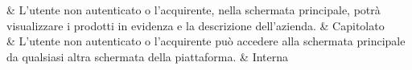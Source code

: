  & L'utente non autenticato o l'acquirente, nella schermata principale, potrà visualizzare i prodotti in evidenza e la descrizione dell'azienda. & Capitolato \\

 & L'utente non autenticato o l'acquirente può accedere alla schermata principale da qualsiasi altra schermata della piattaforma. & Interna \\
